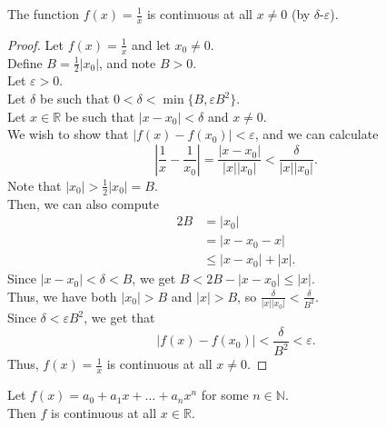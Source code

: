 \documentclass{article}
\newenvironment{theorem}[1]{\renewcommand\theinnercustomthm{#1}\innercustomthm}
  {\endinnercustomthm}
\begin{document}
\newpage{}
\begin{theorem}{3}
    The function $f(x)=\frac{1}{x}$ is continuous at all $x\neq 0$ (by $\delta$-$\varepsilon$).
\end{theorem}
\begin{proof}
    Let $f(x)=\frac{1}{x}$ and let $x_0 \neq 0$. \\
    Define $B = \frac{1}{2}|x_0|$, and note $B > 0$. \\
    Let $\varepsilon > 0$. \\
    Let $\delta$ be such that $0 < \delta < \min \{B, \varepsilon B^2\}$. \\
    Let $x \in \mathbb R$ be such that $|x-x_0| < \delta$ and $x \neq 0$. \\
    We wish to show that $|f(x)-f(x_0)| < \varepsilon$, and we can calculate \[\left|\frac{1}{x} -\frac{1}{x_0}\right| = \frac{|x-x_0|}{|x||x_0|} < \frac{\delta}{|x||x_0|}.\]
    Note that $|x_0| > \frac{1}{2}|x_0| = B$. \\
    Then, we can also compute \begin{align*}
    2B&=|x_0| \\ &= |x-x_0-x| \\ &\le |x-x_0| + |x|.\end{align*}
    Since $|x-x_0| < \delta  < B$, we get $B < 2B - |x-x_0| \le |x|$. \\
    Thus, we have both $|x_0| > B$ and $|x| > B$, so $\frac{\delta}{|x||x_0|} < \frac{\delta}{B^2}$. \\
    Since $\delta < \varepsilon B^2$, we get that \[ \left|f(x) - f(x_0) \right| <\frac{\delta}{B^2} < \varepsilon.\]
    Thus, $f(x)=\frac{1}{x}$ is continuous at all $x \neq 0$.
\end{proof}
\newpage{}
\begin{theorem}{4}
    Let $f(x)=a_0+a_1 x+\dots+ a_nx^n$ for some $n \in \mathbb N$. \\
    Then $f$ is continuous at all $x \in \mathbb R$.
\end{theorem}
\end{document}
